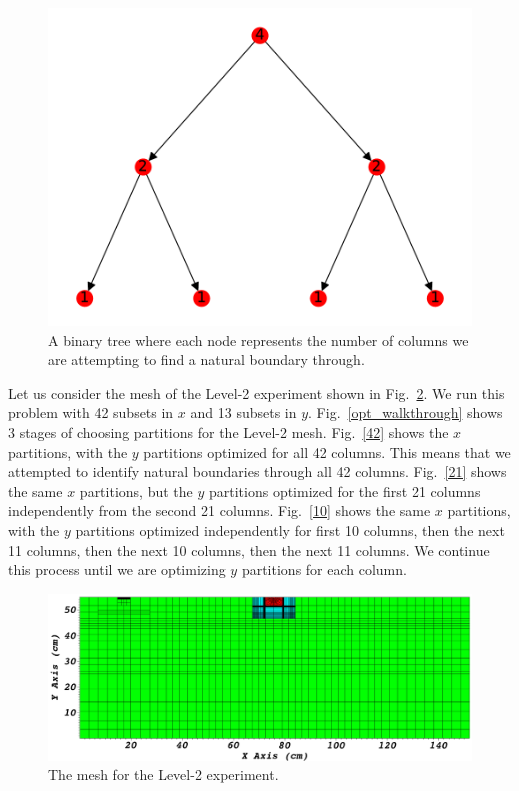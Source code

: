 \begin{figure}[h]
\centering
\includegraphics[scale=0.75]{../figures/binary_tree.pdf}
\caption{A binary tree where each node represents the number of columns we are attempting to find a natural boundary through.}
\label{binary_tree}
\end{figure}

Let us consider the mesh of the Level-2 experiment shown in Fig.~\ref{level2_nocut}.
We run this problem with 42 subsets in $x$ and 13 subsets in $y$.
Fig.~\ref{opt_walkthrough} shows 3 stages of choosing partitions for the Level-2 mesh.
Fig.~\ref{42} shows the $x$ partitions, with the $y$ partitions optimized for all 42 columns.
This means that we attempted to identify natural boundaries through all 42 columns.
Fig.~\ref{21} shows the same $x$ partitions, but the $y$ partitions optimized for the first 21 columns independently from the second 21 columns.
Fig.~\ref{10} shows the same $x$ partitions, with the $y$ partitions optimized independently for first 10 columns, then the next 11 columns, then the next 10 columns, then the next 11 columns.
We continue this process until we are optimizing $y$ partitions for each column.
\begin{figure}[h]
\centering
\includegraphics[scale=0.3]{../../figures/level2_nocut.png}
\caption{The mesh for the Level-2 experiment.}
\label{level2_nocut}
\end{figure}

